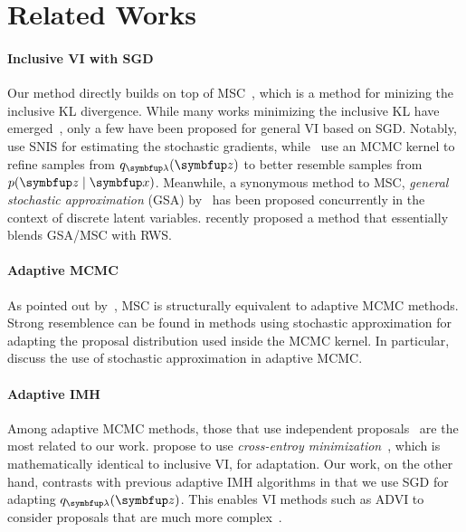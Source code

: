 
\section{Related Works}\label{section:related}
\paragraph{Inclusive VI with SGD}
Our method directly builds on top of MSC~\citep{NEURIPS2020_b2070693}, which is a method for minizing the inclusive KL divergence.
While many works minimizing the inclusive KL have emerged~\citep{DBLP:journals/corr/BornscheinB14, li_approximate_2017, 10.5555/2074022.2074067, pmlr-v124-ou20a, kim2021adaptive}, only a few have been proposed for general VI based on SGD.
Notably,~\citet{DBLP:journals/corr/BornscheinB14} use SNIS for estimating the stochastic gradients, while~\citet{li_approximate_2017} use an MCMC kernel to refine samples from \(q_{\vlambda}(\vz)\) to better resemble samples from \(p(\vz\mid\vx)\).
Meanwhile, a synonymous method to MSC, \textit{general stochastic approximation} (GSA) by~\citet[Algorithm 1]{pmlr-v124-ou20a} has been proposed concurrently in the context of discrete latent variables.
\citet{kim2021adaptive} recently proposed a method that essentially blends GSA/MSC with RWS.

\vspace{-0.1in}
\paragraph{Adaptive MCMC}
As pointed out by~\citet{pmlr-v124-ou20a}, MSC is structurally equivalent to adaptive MCMC methods.
Strong resemblence can be found in methods using stochastic approximation for adapting the proposal distribution used inside the MCMC kernel.
In particular,~\citet{10.1007/s11222-008-9110-y, garthwaite_adaptive_2016} discuss the use of stochastic approximation in adaptive MCMC.

\vspace{-0.1in}
\paragraph{Adaptive IMH}
Among adaptive MCMC methods, those that use independent proposals~\citep{andrieu_ergodicity_2006, keith_adaptive_2008, holden_adaptive_2009, giordani_adaptive_2010} are the most related to our work.
\citet{keith_adaptive_2008} propose to use \textit{cross-entroy minimization}~\citep{barbakh_cross_2009}, which is mathematically identical to inclusive VI, for adaptation.
Our work, on the other hand, contrasts with previous adaptive IMH algorithms in that we use SGD for adapting \(q_{\vlambda}(\vz)\).
This enables VI methods such as ADVI to consider proposals that are much more complex~\citep{JMLR:v18:16-107}.

